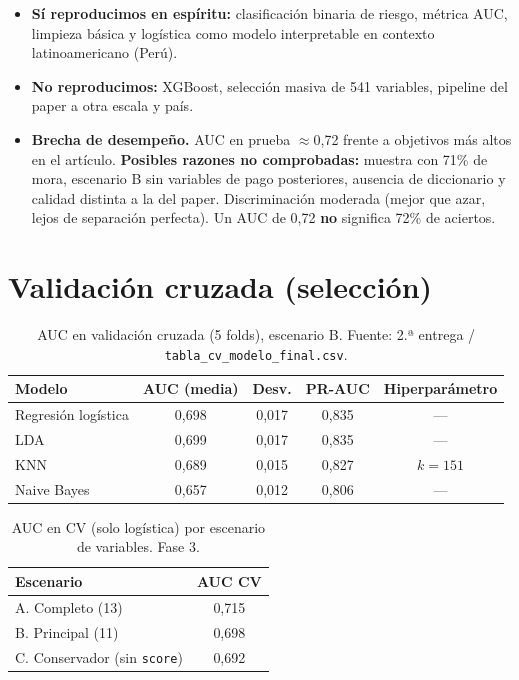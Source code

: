 \documentclass[11pt]{article}
\begin{document}
\begin{itemize}
\item \textbf{Sí reproducimos en espíritu:} clasificación binaria de riesgo, métrica AUC, limpieza básica y logística como modelo interpretable en contexto latinoamericano (Perú).
\item \textbf{No reproducimos:} XGBoost, selección masiva de 541 variables, pipeline del paper a otra escala y país.
\item \textbf{Brecha de desempeño.} AUC en prueba $\approx$0,72 frente a objetivos más altos en el artículo. \textbf{Posibles razones no comprobadas:} muestra con 71\% de mora, escenario B sin variables de pago posteriores, ausencia de diccionario y calidad distinta a la del paper. Discriminación moderada (mejor que azar, lejos de separación perfecta). Un AUC de 0,72 \textbf{no} significa 72\% de aciertos.
\end{itemize}

\section{Validación cruzada (selección)}

\begin{table}[H]
\centering
\caption{AUC en validación cruzada (5 folds), escenario B. Fuente: 2.ª entrega / \texttt{tabla\_cv\_modelo\_final.csv}.}
\label{tab:cv}
\small
\begin{tabular}{@{}lcccc@{}}
\toprule
\textbf{Modelo} & \textbf{AUC (media)} & \textbf{Desv.} & \textbf{PR-AUC} & \textbf{Hiperparámetro} \\
\midrule
Regresión logística & 0,698 & 0,017 & 0,835 & --- \\
LDA & 0,699 & 0,017 & 0,835 & --- \\
KNN & 0,689 & 0,015 & 0,827 & $k = 151$ \\
Naive Bayes & 0,657 & 0,012 & 0,806 & --- \\
\bottomrule
\end{tabular}
\end{table}

\begin{table}[H]
\centering
\caption{AUC en CV (solo logística) por escenario de variables. Fase 3.}
\label{tab:cvabc}
\small
\begin{tabular}{@{}lc@{}}
\toprule
\textbf{Escenario} & \textbf{AUC CV} \\
\midrule
A. Completo (13) & 0,715 \\
B. Principal (11) & 0,698 \\
C. Conservador (sin \texttt{score}) & 0,692 \\
\bottomrule
\end{tabular}
\end{table}
\end{document}
